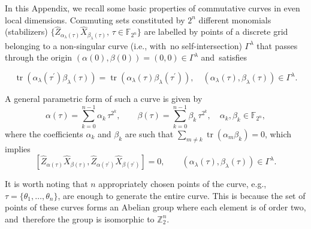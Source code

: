 \documentclass[quantumrep,article,accept,pdftex,moreauthors]{Definitions/mdpi}
\DeclareMathOperator{\tr}{tr}
\begin{document}
In this Appendix, we recall some basic properties of commutative curves in even
local dimensions. Commuting sets constituted by $2^{n}$ different monomials
(stabilizers)
$\{\hat{Z}_{\alpha_{\lambda}(\tau)}\hat{X}_{\beta_{\lambda}(\tau)}, \, \tau \in
\mathbb{F}_{2^{n}}\}$ are labelled by points of a discrete grid belonging to a
non-singular curve (i.e., with~no self-intersection) $\Gamma^{\lambda}$ that
passes through the origin $(\alpha (0),\beta (0))=(0,0)\in \Gamma^{\lambda }$
and~satisfies

\begin{equation*}
  \tr\left( \alpha_{\lambda}(\tau^{\prime})\beta_{\lambda}(\tau) \right)
  = \tr\left( \alpha_{\lambda}(\tau)\beta_{\lambda}(\tau^{\prime}) \right),
  \quad \left( \alpha_{\lambda}(\tau), \beta_{\lambda}(\tau) \right)
  \in \Gamma^{\lambda}.
\end{equation*}

A general parametric form of such a curve is given by
\begin{equation}
  \alpha (\tau)
  = \sum_{k=0}^{n-1}\alpha_{k}\,\tau^{2^{k}}, \qquad \beta(\tau)
  = \sum_{k=0}^{n-1}\beta_{k} \, \tau^{2^{k}},
  \quad \alpha_{k},\beta_{k}\in \mathbb{F}_{2^{n}},
  \label{curve1a}
\end{equation}
where the coefficients $\alpha_k$ and $\beta_k$ are such that $\sum_{m \neq k}
\tr(\alpha_{m}\beta_{k})=0$, which implies
\begin{equation}
  \left[
    \hat{Z}_{\alpha(\tau)}\hat{X}_{\beta(\tau)},
    \hat{Z}_{\alpha(\tau^{\prime})}\hat{X}_{\beta(\tau^{\prime})}
  \right] = 0,
  \qquad \left( \alpha_{\lambda}(\tau),\beta_{\lambda}(\tau) \right)
  \in \Gamma^{\lambda }.
  \label{stab}
\end{equation}

It is worth noting that $n$ appropriately chosen points of the curve, e.g.,
$\tau=\{\theta_{1},\ldots,\theta_{n}\}$, are enough to generate the entire curve.
This is because the set of points of these curves forms an Abelian group where
each element is of order two, and~therefore the group is isomorphic to
$\mathbb{Z}_{2}^n$.
\end{document}
